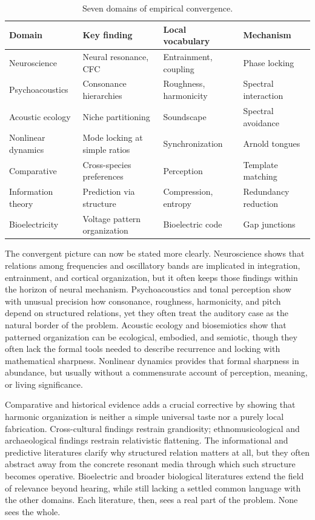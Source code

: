 \begin{table}[ht]
\centering
\caption{Seven domains of empirical convergence.}
\label{tab:convergence-fields}
\small
\begin{tabular}{@{}lp{3.3cm}p{2.8cm}l@{}}
\toprule
Domain & Key finding & Local vocabulary & Mechanism \\
\midrule
Neuroscience & Neural resonance, CFC & Entrainment, coupling & Phase locking \\
Psychoacoustics & Consonance hierarchies & Roughness, harmonicity & Spectral interaction \\
Acoustic ecology & Niche partitioning & Soundscape & Spectral avoidance \\
Nonlinear dynamics & Mode locking at simple ratios & Synchronization & Arnold tongues \\
Comparative & Cross-species preferences & Perception & Template matching \\
Information theory & Prediction via structure & Compression, entropy & Redundancy reduction \\
Bioelectricity & Voltage pattern organization & Bioelectric code & Gap junctions \\
\bottomrule
\end{tabular}
\end{table}

The convergent picture can now be stated more clearly. Neuroscience shows that relations among frequencies and oscillatory bands are implicated in integration, entrainment, and cortical organization, but it often keeps those findings within the horizon of neural mechanism. Psychoacoustics and tonal perception show with unusual precision how consonance, roughness, harmonicity, and pitch depend on structured relations, yet they often treat the auditory case as the natural border of the problem. Acoustic ecology and biosemiotics show that patterned organization can be ecological, embodied, and semiotic, though they often lack the formal tools needed to describe recurrence and locking with mathematical sharpness. Nonlinear dynamics provides that formal sharpness in abundance, but usually without a commensurate account of perception, meaning, or living significance.

Comparative and historical evidence adds a crucial corrective by showing that harmonic organization is neither a simple universal taste nor a purely local fabrication. Cross-cultural findings restrain grandiosity; ethnomusicological and archaeological findings restrain relativistic flattening. The informational and predictive literatures clarify why structured relation matters at all, but they often abstract away from the concrete resonant media through which such structure becomes operative. Bioelectric and broader biological literatures extend the field of relevance beyond hearing, while still lacking a settled common language with the other domains. Each literature, then, sees a real part of the problem. None sees the whole.

